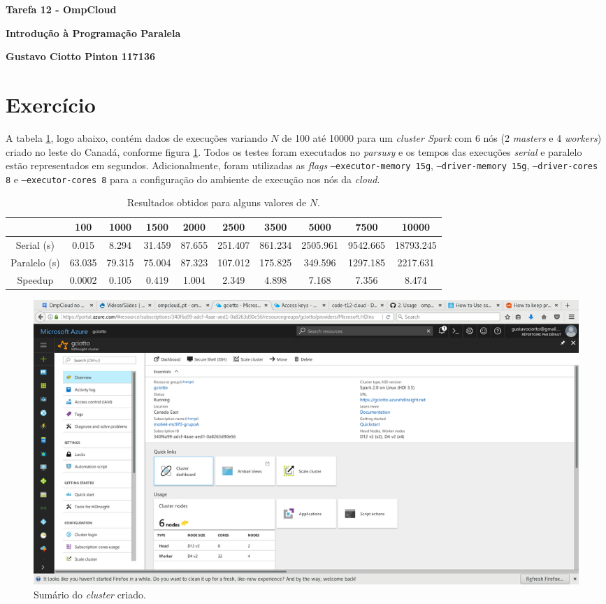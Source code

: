 \documentclass[12pt, a4paper]{article}
\begin{document}
{\large
\centerline{\textbf{Tarefa 12 - OmpCloud}}
\centerline{\textbf{Introdução à Programação Paralela}}
\centerline{\textbf{Gustavo Ciotto Pinton 117136}}
}

\section{Exercício}

A tabela \ref{tab:resultados}, logo abaixo, contém dados de execuções variando
\(N\) de 100 até 10000 para um \textit{cluster Spark} com 6 nós (2
\textit{masters} e 4 \textit{workers}) criado no leste do Canadá, conforme
figura \ref{fig:dashboard}. Todos os testes foram executados no \textit{parsusy}
e os tempos das execuções \textit{serial} e paralelo estão representados em
segundos. Adicionalmente, foram utilizadas as \textit{flags}
\texttt{--executor-memory 15g}, \texttt{--driver-memory 15g},
\texttt{--driver-cores 8} e \texttt{--executor-cores 8} para a configuração do
ambiente de execução nos nós da \textit{cloud}.

\begin{table}[h]
    \centering
    \footnotesize
	\caption{\label{tab:resultados} Resultados obtidos para alguns valores de \(N\).} 
	\begin{tabular}{| c | c | c | c | c | c | c | c | c | c |}
		\hline
		 & \textbf{100} & \textbf{1000} & \textbf{1500} & \textbf{2000} & 
		 \textbf{2500} & \textbf{3500} & \textbf{5000} & \textbf{7500} &
		 \textbf{10000} \\\hline Serial (s) & 0.015  & 8.294 & 31.459 & 87.655 &
		 251.407 & 861.234 & 2505.961 & 9542.665 & 18793.245 \\\hline Paralelo (s) &
		 63.035 & 79.315 & 75.004 & 87.323 & 107.012 & 175.825 & 349.596 & 1297.185 & 2217.631 \\\hline Speedup & 0.0002 & 0.105  & 0.419 &
		 1.004 & 2.349 & 4.898 & 7.168 & 7.356 & 8.474 \\\hline
		
	\end{tabular}
\end{table}

\begin{figure}[h!] 
    \centering
    \includegraphics[width=\textwidth]{img/dashboard}
    \caption{Sumário do \textit{cluster} criado.}        
    \label{fig:dashboard}
\end{figure}
\end{document}
